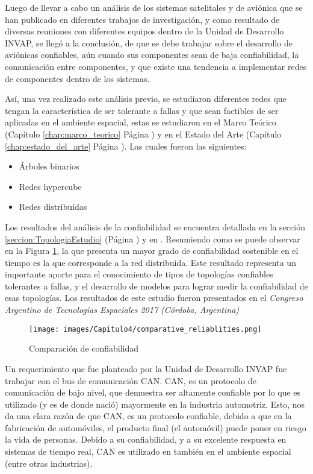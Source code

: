 Luego de llevar a cabo un análisis de los sistemas satelitales y de aviónica que se
han publicado en diferentes trabajos de investigación, y como resultado de  diversas reuniones
con diferentes equipos dentro de la Unidad de Desarrollo INVAP, se llegó a la conclusión,
de que se debe trabajar sobre el  desarrollo de aviónicas confiables,
aún cuando sus componentes sean de baja confiabilidad, la comunicación entre componentes,
y que existe una tendencia a implementar redes de componentes dentro de los sistemas.

Así, una vez realizado este análisis previo, se estudiaron diferentes redes que tengan
la característica de ser tolerante a fallas y que sean factibles de ser
aplicadas en el ambiente espacial, estas se estudiaron en el Marco
Teórico (Capítulo \ref{chap:marco_teorico} Página \pageref{chap:marco_teorico}) y en
el Estado del Arte (Capítulo \ref{chap:estado_del_arte} Página \pageref{chap:estado_del_arte}).
Las cuales fueron las siguientes:
\begin{itemize}
\item Árboles binarios
\item Redes hypercube
\item Redes distribuídas
\end{itemize}

Los resultados del análisis de la confiabilidad se encuentra detallada en la sección
\ref{seccion:TopologiaEstudio} (Página \pageref{seccion:TopologiaEstudio}) y en
\cite{Arias17}. Resumiendo como se puede observar en la Figura
\ref{fig:comparative_reliablitiesConclusion}, la que presenta un mayor grado
de confiabilidad sostenible en el tiempo es la que corresponde a
la red distribuida. Este resultado representa un importante aporte para el
conocimiento de tipos de topologías confiables tolerantes a fallas, y el desarrollo de
modelos para lograr medir la confiabilidad de esas topologías. Los resultados de
este estudio fueron presentados en el \textit{Congreso Argentino de Tecnologías
  Espaciales 2017 (Córdoba, Argentina)}

\begin{figure}[H]
 \centering
 \texttt{[image: images/Capitulo4/comparative\_reliablities.png]}
  \caption{Comparación de confiabilidad}
\label{fig:comparative_reliablitiesConclusion}
\end{figure}

Un requerimiento que fue planteado por la Unidad de Desarrollo INVAP fue trabajar
con el bus de comunicación CAN. CAN, es un protocolo de comunicación de bajo nivel,
que demuestra ser altamente confiable por lo que es utilizado (y es de donde nació)
mayormente en la industria automotriz. Esto, nos da una clara razón de que CAN, es un
protocolo confiable, debido a que en la fabricación de automóviles, el producto final
(el automóvil) puede poner en riesgo la vida de personas. Debido a su confiabilidad,
y a su excelente respuesta en sistemas de tiempo real, CAN es utilizado en también en
el ambiente espacial (entre otras industrias).

